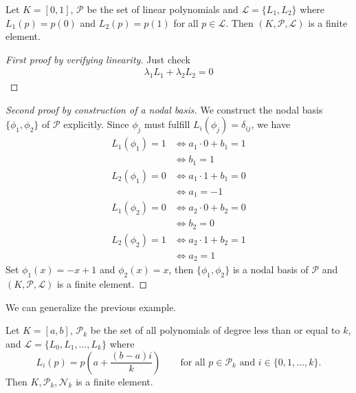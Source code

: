 \begin{example}
    Let \(K = [0, 1]\), \(\mathcal{P}\) be the set of linear polynomials and \(\mathcal{L} = \{L_1, L_2\}\) where \(L_1(p) = p(0)\) and \(L_2(p) = p(1)\) for all \(p \in \mathcal{L}\). Then \((K, \mathcal{P}, \mathcal{L})\) is a finite element.
\end{example}
\begin{proof}[First proof by verifying linearity]
    Just check
    \begin{align*}
        \lambda_1 L_1 + \lambda_2 L_2 = 0
    \end{align*}
\end{proof}
\begin{proof}[Second proof by construction of a nodal basis]
    We construct the nodal basis \(\{\phi_1, \phi_2\}\) of \(\mathcal{P}\) explicitly. Since \(\phi_j\) must fulfill \(L_i (\phi_j) = \delta_{ij}\), we have
    \begin{align*}
        L_1 (\phi_1) = 1 & \iff a_1 \cdot 0 + b_1 = 1 \\
        & \iff b_1 = 1 \\
        L_2 (\phi_1) = 0 & \iff a_1 \cdot 1 + b_1 = 0 \\
        & \iff a_1 = -1 \\
        L_1 (\phi_2) = 0 & \iff a_2 \cdot 0 + b_2 = 0 \\
        & \iff b_2 = 0 \\
        L_2 (\phi_2) = 1 & \iff a_2 \cdot 1 + b_2 = 1 \\
        & \iff a_2 = 1
    \end{align*}
    Set \(\phi_1(x) = - x + 1\) and \(\phi_2(x) = x\), then \(\{\phi_1, \phi_2\}\) is a nodal basis of \(\mathcal{P}\) and \((K, \mathcal{P}, \mathcal{L})\) is a finite element.
\end{proof}

We can generalize the previous example.

\begin{example}
    Let \(K = [a, b]\), \(\mathcal{P}_k\) be the set of all polynomials of degree less than or equal to \(k\), and \(\mathcal{L} = \{L_0, L_1, \ldots, L_k\}\) where
    \begin{equation}
        L_i (p) = p \left( a + \frac{(b-a) i}{k} \right) \qquad \text{for all \(p \in \mathcal{P}_k\) and \(i \in \{0, 1, \ldots, k\}\).}
    \end{equation}
    Then \(K, \mathcal{P}_k, \mathcal{N}_k\) is a finite element.
\end{example}

